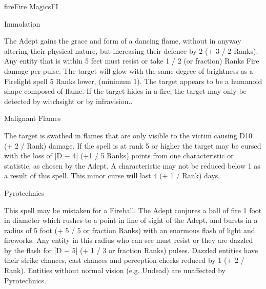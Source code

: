 \begin{College}[2.0]{fire}{Fire Magics}{FI}
\begin{spell}[S-7]{Immolation}

\begin{effects}
The Adept gains the grace and form of a dancing flame, without in
anyway altering their physical nature, but increasing their defence by
2 (+ 3 / 2 Ranks).  Any entity that is within 5 feet must resist or
take 1 / 2 (or fraction) Ranks Fire damage per pulse.  The target will
glow with the same degree of brightness as a Firelight spell 5 Ranks
lower, (minimum 1).  The target appears to be a humanoid shape
composed of flame.  If the target hides in a fire, the target may only
be detected by witchsight or by infravision..
\end{effects}
\end{spell}

\begin{spell}[S-8]{Malignant Flames}

\begin{effects}
The target is swathed in flames that are only visible to the victim
causing D10 (+ 2 / Rank) damage. If the spell is at rank 5 or higher
the target may be cursed with the loss of [D − 4] (+1 / 5 Ranks)
points from one characteristic or statistic, as chosen by the Adept.
A characteristic may not be reduced below 1 as a result of this spell.
This minor curse will last 4 (+ 1 / Rank) days.
\end{effects}
\end{spell}

\begin{spell}[S-9]{Pyrotechnics}

\begin{effects}
This spell may be mistaken for a Fireball.  The Adept conjures a ball
of fire 1 foot in diameter which rushes to a point in line of sight of
the Adept, and bursts in a radius of 5 foot (+ 5 / 5 or fraction
Ranks) with an enormous flash of light and fireworks.  Any entity in
this radius who can see must resist or they are dazzled by the flash
for [D − 5] (+ 1 / 3 or fraction Ranks) pulses. Dazzled entities have
their strike chances, cast chances and perception checks reduced by 1
(+ 2 / Rank). Entities without normal vision (e.g.  Undead) are
unaffected by Pyrotechnics.
\end{effects}
\end{spell}


\end{College}
